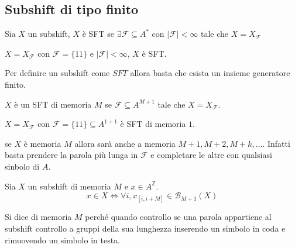 \subsection{Subshift di tipo finito}
\begin{definizione} 
    Sia $X$ un subshift, $X$ è SFT se $\exists \mathcal{F}\subseteq A^\ast$ con
    $|\mathcal{F}|<\infty$ tale che $X= X_\mathcal{F}$
\end{definizione}

\begin{esempio}
    $X=X_\mathcal{F}$ con $\mathcal{F} = \{11\}$ e $|\mathcal{F}|<\infty$, $X$ è
    SFT.
\end{esempio}

Per definire un subshift come $SFT$ allora basta che esista un insieme generatore
finito.
\begin{definizione}
    $X$ è un SFT di memoria $M$ se  $\mathcal{F}\subseteq A^{M+1}$ tale che $X=X_\mathcal{F}$.
\end{definizione}

\begin{esempio}
    $X=X_\mathcal{F}$ con $\mathcal{F} = \{11\}\subseteq A^{1+1}$ è
    SFT di memoria $1$.
\end{esempio}

\begin{nota}
    se $X$ è memoria $M$ allora sarà anche a memoria $M+1,M+2,M+k,\dots$. Infatti
    basta prendere la parola più lunga in $\mathcal{F}$ e completare le altre
    con qualsiasi sinbolo di $A$.
\end{nota}

\begin{teorema}
    Sia $X$ un subshift di memoria $M$ e $x\in A^{\mathbb{Z}}$.
    $$x\in X\iff \forall i, x_{[i,i+M]}\in \mathcal{B}_{M+1}(X)$$
\end{teorema}
Si dice di memoria $M$ perché quando controllo se una parola appartiene al subshift
controllo a gruppi della sua lunghezza inserendo un simbolo in coda e rimuovendo un
simbolo in testa.


